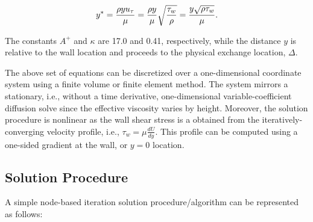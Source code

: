 \documentclass{article}
\begin{document}
\begin{align} 
       y^* =  {{ \rho y u_{\tau}} \over {\mu }} =  {{ \rho y } \over {\mu}}\sqrt{\frac{\tau_w}{\rho}} 
       =  \frac{y \sqrt{\rho \tau_w}}{\mu}.
\label{odeExpressionYStar}
\end{align}

The constants $A^+$ and $\kappa$ are 17.0 and 0.41, respectively, while the distance $y$ is relative
to the wall location and proceeds to the physical exchange location, $\Delta$.

The above set of equations can be discretized over a one-dimensional coordinate system using a finite volume or 
finite element method. The system mirrors a stationary, i.e., without a time derivative,  one-dimensional 
variable-coefficient diffusion solve since 
the effective viscosity varies by height. Moreover, the solution procedure is nonlinear as the wall shear 
stress is a obtained from the iteratively-converging velocity profile, i.e., $\tau_w = \mu \frac{dU}{dy}$. 
This profile can be computed using a one-sided gradient at the wall, or $y=0$ location. 

\subsection{Solution Procedure}
A simple node-based iteration solution procedure/algorithm can be represented as follows:
\end{document}
